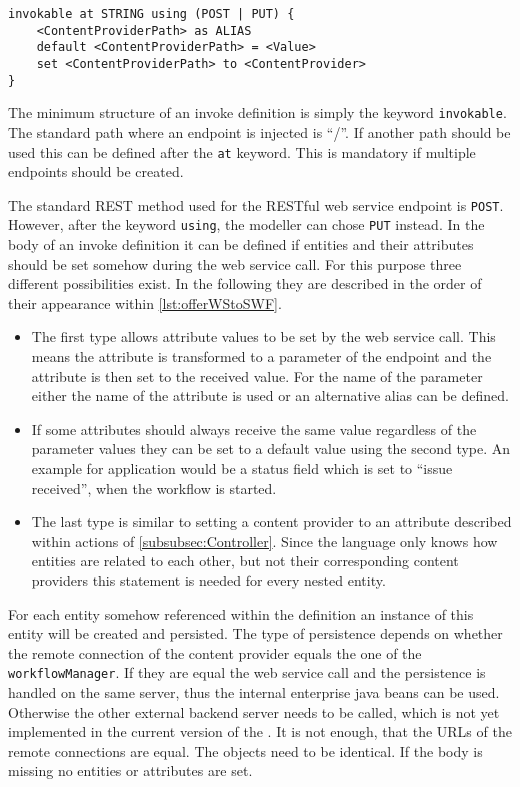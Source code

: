 \begin{lstlisting}[language=MD2, label=lst:offerWStoSWF, caption=Offer a web service to start a workflow]
invokable at STRING using (POST | PUT) {
	<ContentProviderPath> as ALIAS
	default <ContentProviderPath> = <Value>
	set <ContentProviderPath> to <ContentProvider>
}
\end{lstlisting}
The minimum structure of an invoke definition is simply the keyword \lstinline|invokable|. The standard path where an endpoint is injected is \enquote{/}. If another path should be used this can be defined after the \lstinline|at| keyword. This is mandatory if multiple endpoints should be created.

The standard REST method used for the RESTful web service endpoint is \lstinline|POST|. However, after the keyword \lstinline|using|, the modeller can chose \lstinline|PUT| instead.
In the body of an invoke definition it can be defined if entities and their attributes should be set somehow during the web service call. For this purpose three different possibilities exist. In the following they are described in the order of their appearance within \cref{lst:offerWStoSWF}.
\begin{itemize}
	\item The first type allows attribute values to be set by the web service call. This means the attribute is transformed to a parameter of the endpoint and the attribute is then set to the received value. For the name of the parameter either the name of the attribute is used or an alternative alias can be defined.
	\item If some attributes should always receive the same value regardless of the parameter values they can be set to a default value using the second type. An example for application would be a status field which is set to \enquote{issue received}, when the workflow is started.
	\item The last type is similar to setting a content provider to an attribute described within actions of \cref{subsubsec:Controller}. Since the language only knows how entities are related to each other, but not their corresponding content providers this statement is needed for every nested entity.
\end{itemize}
For each entity somehow referenced within the definition an instance of this entity will be created and persisted. The type of persistence depends on whether the remote connection of the content provider equals the one of the \lstinline|workflowManager|. If they are equal the web service call and the persistence is handled on the same server, thus the internal enterprise java beans can be used. Otherwise the other external backend server needs to be called, which is not yet implemented in the current version of the \MD. It is not enough, that the URLs of the remote connections are equal. The objects need to be identical.
If the body is missing no entities or attributes are set.